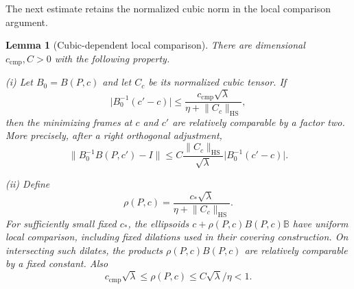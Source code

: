 \documentclass[11pt]{amsart}
\newtheorem{lemma}[theorem]{Lemma}
\theoremstyle{definition}
\theoremstyle{remark}
\newcommand{\norm}[1]{\lVert #1\rVert}
\newcommand{\abs}[1]{\lvert #1\rvert}
\numberwithin{equation}{section}
\begin{document}
The next estimate retains the normalized cubic norm in the local comparison argument.

\begin{lemma}[Cubic-dependent local comparison]\label{low:3:lem:larger-radius}
There are dimensional $c_{\mathrm{cmp}},C>0$ with the following property.

\noindent\textup{(i)} Let $B_0=B(P,c)$ and let $C_{c}$ be its normalized cubic tensor. If
\begin{equation}\label{low:3:eq:larger-radius}
\abs{B_0^{-1}(c'-c)}\leq\frac{c_{\mathrm{cmp}}\sqrt\lambda}{\eta+\norm{C_c}_{\mathrm{HS}}},
\end{equation}
then the minimizing frames at $c$ and $c'$ are relatively comparable by a factor two. More precisely, after a right orthogonal adjustment,
\begin{equation}\label{low:3:eq:larger-radius-close}
\norm{B_0^{-1}B(P,c')-I}\leq C\frac{\norm{C_c}_{\mathrm{HS}}}{\sqrt\lambda}\abs{B_0^{-1}(c'-c)}.
\end{equation}

\noindent\textup{(ii)} Define
\begin{equation}\label{low:3:eq:adaptive-radius}
\rho(P,c)=\frac{c_*\sqrt\lambda}{\eta+\norm{C_c}_{\mathrm{HS}}}.
\end{equation}
For sufficiently small fixed $c_*$, the ellipsoids $c+\rho(P,c)B(P,c)\mathbb B$ have uniform local comparison, including fixed dilations used in their covering construction. On intersecting such dilates, the products $\rho(P,c)B(P,c)$ are relatively comparable by a fixed constant. Also
\begin{equation}\label{low:3:eq:rho-bounds}
c_{\mathrm{cmp}}\sqrt\lambda\leq\rho(P,c)\leq C\sqrt\lambda/\eta<1.
\end{equation}
\end{lemma}
\end{document}
